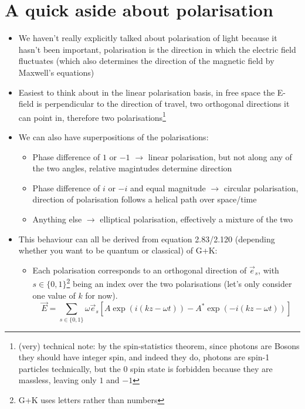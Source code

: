 \documentclass[english]{article}
\begin{document}
\section{A quick aside about polarisation}

\begin{itemize}
\item We haven't really explicitly talked about polarisation of light because it hasn't been important, polarisation is the direction in which the electric field fluctuates (which also determines the direction of the magnetic field by Maxwell's equations)
\item Easiest to think about in the linear polarisation basis, in free space the E-field is perpendicular to the direction of travel, two orthogonal directions it can point in, therefore two polarisations\footnote{(very) technical note: by the spin-statistics theorem, since photons are Bosons they should have integer spin, and indeed they do, photons are spin-1 particles technically, but the $0$ spin state is forbidden because they are massless, leaving only $1$ and $-1$}
\item We can also have superpositions of the polarisations:
\begin{itemize}
\item Phase difference of $1$ or $-1$ $\rightarrow$ linear polarisation, but not along any of the two angles, relative magintudes determine direction
\item Phase difference of $i$ or $-i$ and equal magnitude $\rightarrow$ circular polarisation, direction of polarisation follows a helical path over space/time
\item Anything else $\rightarrow$ elliptical polarisation, effectively a mixture of the two
\end{itemize}
\item This behaviour can all be derived from equation 2.83/2.120 (depending whether you want to be quantum or classical) of G+K: 
\begin{itemize}
\item Each polarisation corresponds to an orthogonal direction of $\vec{e}_s$, with $s \in \{0,1\}$\footnote{G+K uses letters rather than numbers} being an index over the two polarisations (let's only consider one value of $k$ for now).
\begin{equation}
\vec{E}=\sum_{s\in \{0,1\}}\omega\vec{e}_s\left[A\exp\left(i(k z-\omega t)\right)-A^*\exp\left(-i(k z-\omega t)\right)\right] \label{eq:simp_E}
\end{equation}

\end{itemize}
\end{itemize}
\end{document}
